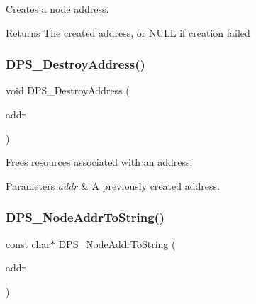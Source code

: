 Creates a node address. 

\begin{DoxyReturn}{Returns}
The created address, or N\+U\+LL if creation failed 
\end{DoxyReturn}
\mbox{\label{group__nodeaddress_ga1f373831e8009ff5959ccb02b8c3fb14}} 
\subsubsection{\texorpdfstring{D\+P\+S\+\_\+\+Destroy\+Address()}{DPS\_DestroyAddress()}}
{\footnotesize\ttfamily void D\+P\+S\+\_\+\+Destroy\+Address (\begin{DoxyParamCaption}\item[{\hyperlink{group__nodeaddress_ga9e9f56aa38e82b4edcef7eb81e9f5bd2}{D\+P\+S\+\_\+\+Node\+Address} $\ast$}]{addr }\end{DoxyParamCaption})}



Frees resources associated with an address. 


\begin{DoxyParams}{Parameters}
{\em addr} & A previously created address. \\
\hline
\end{DoxyParams}
\mbox{\label{group__nodeaddress_gafc7b21048f92370ca29325d6245b576d}} 
\subsubsection{\texorpdfstring{D\+P\+S\+\_\+\+Node\+Addr\+To\+String()}{DPS\_NodeAddrToString()}}
{\footnotesize\ttfamily const char$\ast$ D\+P\+S\+\_\+\+Node\+Addr\+To\+String (\begin{DoxyParamCaption}\item[{const \hyperlink{group__nodeaddress_ga9e9f56aa38e82b4edcef7eb81e9f5bd2}{D\+P\+S\+\_\+\+Node\+Address} $\ast$}]{addr }\end{DoxyParamCaption})}




